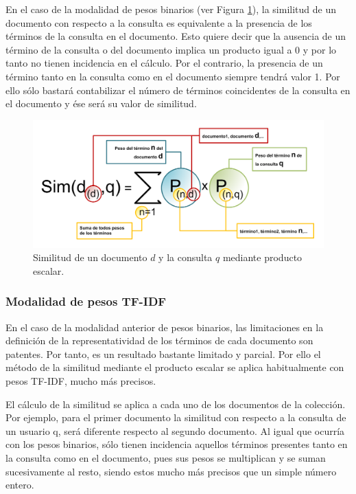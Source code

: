 \documentclass{article}
\begin{document}
En el caso de la modalidad de pesos binarios (ver Figura \ref{fig: Figure 1}), la similitud de un documento con respecto a la consulta es equivalente a la presencia de los términos de la consulta en el documento. Esto quiere decir que la ausencia de un término de la consulta o del documento implica un producto igual a 0 y por lo tanto no tienen incidencia en el cálculo. Por el contrario, la presencia de un término tanto en la consulta como en el documento siempre tendrá valor 1. Por ello sólo bastará contabilizar el número de términos coincidentes de la consulta en el documento y ése será su valor de similitud.

\begin{figure}[h]
	\begin{center}
		\includegraphics*[scale=0.7]{similitud_producto_escalar.png}
	\end{center}
	\caption{Similitud de un documento $d$ y la consulta $q$ mediante producto escalar.}
	\label{fig: Figure 1}
\end{figure}

\subsubsection{Modalidad de pesos TF-IDF}

En el caso de la modalidad anterior de pesos binarios, las limitaciones en la definición de la representatividad de los términos de cada documento son patentes. Por tanto, es un resultado bastante limitado y parcial. Por ello el método de la similitud mediante el producto escalar se aplica habitualmente con pesos TF-IDF, mucho más precisos.

El cálculo de la similitud se aplica a cada uno de los documentos de la colección. Por ejemplo, para el primer documento la similitud con respecto a la consulta de un usuario q, será diferente respecto al segundo documento. Al igual que ocurría con los pesos binarios, sólo tienen incidencia aquellos términos presentes tanto en la consulta como en el documento, pues sus pesos se multiplican y se suman sucesivamente al resto, siendo estos mucho más precisos que un simple número entero.
\end{document}
